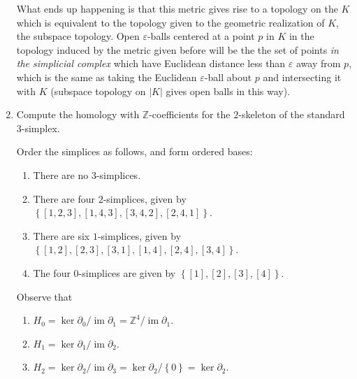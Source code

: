 \documentclass[11pt]{article}
\newcommand{\cbr}[1]{\left\{#1\right\}}
\DeclareMathOperator{\im}{im}
\begin{document}
\begin{enumerate}
    What ends up happening is that this metric gives rise to a topology on the $K$ which is equivalent to the topology given to the geometric realization of $K$, the subspace topology. Open $\varepsilon$-balls centered at a point $p$ in $K$ in the topology induced by the metric given before will be the the set of points \textit{in the simplicial complex} which have Euclidean distance less than $\varepsilon$ away from $p$, which is the same as taking the Euclidean $\varepsilon$-ball about $p$ and intersecting it with $K$ (subspace topology on $|K|$ gives open balls in this way).
    
    \item Compute the homology with $\mathbb{Z}$-coefficients for the $2$-skeleton of the standard $3$-simplex.
    
    Order the simplices as follows, and form ordered bases: \begin{enumerate}
        \item There are no $3$-simplices.
        \item There are four $2$-simplices, given by $\cbr{[1,2,3],[1,4,3],[3,4,2],[2,4,1]}$.
        \item There are six $1$-simplices, given by $\cbr{[1,2],[2,3],[3,1],[1,4],[2,4],[3,4]}$.
        \item The four $0$-simplices are given by $\cbr{[1],[2],[3],[4]}$.
    \end{enumerate}

    Observe that \begin{enumerate}
        \item $H_0 = \ker\partial_0/\im\partial_1 = \mathbb{Z}^4/\im\partial_1$.
        \item $H_1 = \ker\partial_1/\im\partial_2$.
        \item $H_2 = \ker\partial_2/\im\partial_3 = \ker\partial_2/\cbr{0} = \ker\partial_2$.
    \end{enumerate}


\end{enumerate}
\end{document}
